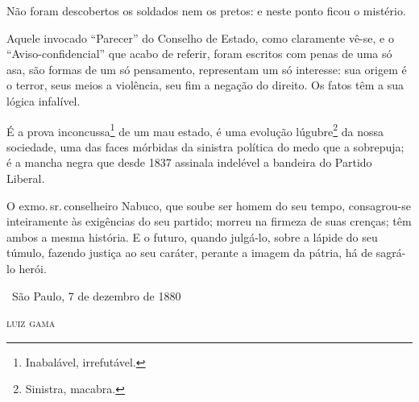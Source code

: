 Não foram descobertos os soldados nem os pretos: e neste ponto ficou o
mistério.

Aquele invocado ``Parecer'' do Conselho de Estado, como claramente vê-se,
e o ``Aviso-confidencial'' que acabo de referir, foram escritos com penas
de uma só asa, são formas de um só pensamento, representam um só
interesse: sua origem é o terror, seus meios a violência, seu fim a
negação do direito. Os fatos têm a sua lógica infalível.

É a prova inconcussa\footnote{Inabalável, irrefutável.} de um mau
estado, é uma evolução lúgubre\footnote{Sinistra, macabra.}
da nossa sociedade, uma das
faces mórbidas da sinistra política do medo que a sobrepuja; é a mancha
negra que desde 1837 assinala indelével a bandeira do Partido Liberal.

O exmo.\,sr.\,conselheiro Nabuco, que soube ser homem do seu tempo,
consagrou-se inteiramente às exigências do seu partido; morreu na
firmeza de suas crenças; têm ambos a mesma história. E o futuro, quando
julgá-lo, sobre a lápide do seu túmulo, fazendo justiça ao seu caráter,
perante a imagem da pátria, há de sagrá-lo herói.

\medskip

\hfill\ São Paulo, 7 de dezembro de 1880

\hfill\textsc{luiz gama}



